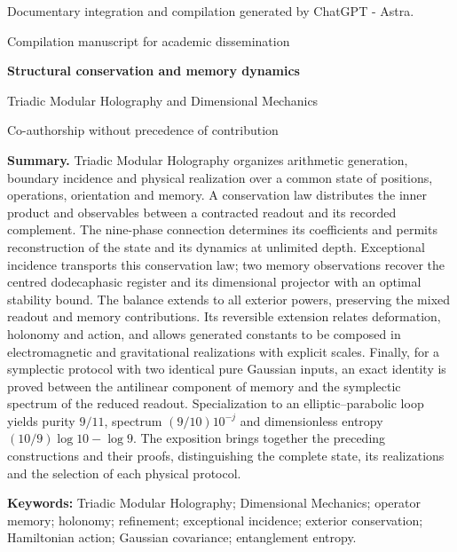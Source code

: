 \thispagestyle{plain}
\begin{center}
{\fontsize{8}{10}\selectfont Documentary integration and compilation generated by ChatGPT - Astra.\par}
{\fontsize{9}{11}\selectfont Compilation manuscript for academic dissemination\par}
\vspace{6mm}
{\fontsize{20}{24}\selectfont\bfseries Structural conservation and memory dynamics\par}
\vspace{3mm}
{\fontsize{12}{15}\selectfont Triadic Modular Holography and Dimensional Mechanics\par}
\vspace{5mm}
{\fontsize{10}{12}\selectfont\Autores\par}
{\fontsize{8}{10}\selectfont Co-authorship without precedence of contribution\par}
\end{center}
\vspace{4mm}
\noindent\textbf{Summary.}
Triadic Modular Holography organizes arithmetic generation, boundary incidence and physical realization over a common state of positions, operations, orientation and memory. A conservation law distributes the inner product and observables between a contracted readout and its recorded complement. The nine-phase connection determines its coefficients and permits reconstruction of the state and its dynamics at unlimited depth. Exceptional incidence transports this conservation law; two memory observations recover the centred dodecaphasic register and its dimensional projector with an optimal stability bound. The balance extends to all exterior powers, preserving the mixed readout and memory contributions. Its reversible extension relates deformation, holonomy and action, and allows generated constants to be composed in electromagnetic and gravitational realizations with explicit scales. Finally, for a symplectic protocol with two identical pure Gaussian inputs, an exact identity is proved between the antilinear component of memory and the symplectic spectrum of the reduced readout. Specialization to an elliptic--parabolic loop yields purity \(9/11\), spectrum \((9/10)10^{-j}\) and dimensionless entropy \((10/9)\log10-\log9\). The exposition brings together the preceding constructions and their proofs, distinguishing the complete state, its realizations and the selection of each physical protocol.

\medskip
\noindent\textbf{Keywords:} Triadic Modular Holography; Dimensional Mechanics; operator memory; holonomy; refinement; exceptional incidence; exterior conservation; Hamiltonian action; Gaussian covariance; entanglement entropy.

